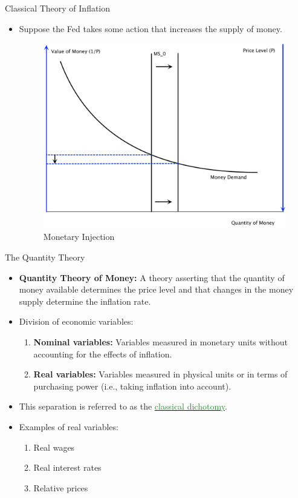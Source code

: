 \documentclass[xcolor={dvipsnames},pdf, hyperref={colorlinks=true, citecolor=ForestGreen, linkcolor=BlueViolet, urlcolor=Magenta}]{beamer}
\theoremstyle{definition}
\newcommand{\defn}[1]{\textbf{#1}}
\newcommand{\dd}[1]{{\underline{\textcolor{ForestGreen}{#1}}}}
\begin{document}
\begin{frame}{Classical Theory of Inflation}
	\begin{itemize}
		\item 	Suppose the Fed takes some action that increases the supply of money. 
		
		\begin{figure}[H]
			\centering
			\includegraphics[scale=.3]{plot94.pdf}
			\caption{Monetary Injection}
		\end{figure}
	
	\end{itemize}
\end{frame}



\begin{frame}{The Quantity Theory}
	\begin{itemize}
	\item \defn{Quantity Theory of Money:} A theory asserting that the quantity of money available determines the price level and that changes in the money supply determine the inflation rate.
		\item Division of economic variables:
		\begin{enumerate}
			\item \textbf{Nominal variables:} Variables measured in monetary units without accounting for the effects of inflation.
			\item \textbf{Real variables:} Variables measured in physical units or in terms of purchasing power (i.e., taking inflation into account).
		\end{enumerate}
		
		\item This separation is referred to as the \dd{classical dichotomy}. 
		\item Examples of real variables:
		\begin{enumerate}
			\item Real wages
			\item Real interest rates
			\item Relative prices
		\end{enumerate}
	\end{itemize}
\end{frame}
\end{document}

